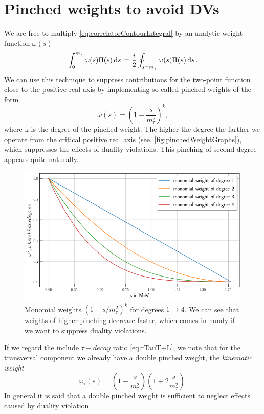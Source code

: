 \documentclass[../../index.tex]{subfiles}
\begin{document}
\section{Pinched weights to avoid DVs}
We are free to multiply \cref{eq:correlatorContourIntegral} by an analytic weight function $\omega(s)$
\begin{equation}
  \int_0^{m_\tau} \omega(s) \Pi(s) \dif s = \frac{i}{2} \oint_{s=m_\tau} \omega(s) \Pi(s) \dif s.
\end{equation}
We can use this technique to suppress contributions for the two-point function
close to the positive real axis by implementing so called pinched
  weights of the form
\begin{equation}
  \omega(s) = \left(1-\frac{s}{m_\tau^2}\right)^k,
\end{equation}
where k is the degree of the pinched weight. The higher the degree the farther
we operate from the critical positive real axis (see. \cref{fig:pinchedWeightGraphs}), which suppresses the effects of
duality violations. This pinching of second degree appears quite naturally.
\begin{figure}
  \centering
  \includegraphics[width=\textwidth]{./images/monomialWeightGraphs.png}
  \caption{Monomial weights $(1-s/m_\tau^2)^k$ for degrees $1\to4$. We can see
    that weights of higher pinching decrease faster, which comes in handy if we
  want to suppress duality violations.}
  \label{fig:monomialWeightGraphs}
\end{figure}
If we regard the include $\tau-decay$ ratio \cref{eq:rTauT+L}, we note that for the
transversal component we already have a double pinched weight, the
\textit{kinematic weight}
\begin{equation}
  \label{eq:kinematicWeight}
  \omega_\tau(s) = \left( 1-\frac{s}{m_\tau^2} \right) \left( 1 + 2 \frac{s}{m_\tau^2} \right).
\end{equation}
In general it is said that a double pinched weight is sufficient to neglect
effects caused by duality violation.
\end{document}
